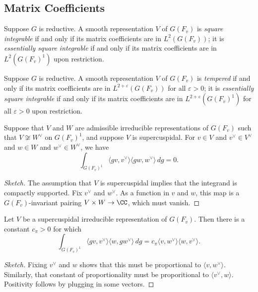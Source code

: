 \documentclass{article}
\begin{document}
\subsection{Matrix Coefficients}
\begin{definition}
	Suppose $G$ is reductive. A smooth representation $V$ of $G(F_v)$ is \textit{square integrable} if and only if its matrix coefficients are in $L^2(G(F_v))$; it is \textit{essentially square integrable} if and only if its matrix coefficients are in $L^2\left(G(F_v)^1\right)$ upon restriction.
\end{definition}
\begin{definition}[tempered]
	Suppose $G$ is reductive. A smooth representation $V$ of $G(F_v)$ is \textit{tempered} if and only if its matrix coefficients are in $L^{2+\varepsilon}(G(F_v))$ for all $\varepsilon>0$; it is \textit{essentially square integrable} if and only if its matrix coefficients are in $L^{2+\varepsilon}\left(G(F_v)^1\right)$ for all $\varepsilon>0$ upon restriction.
\end{definition}
\begin{lemma}[Orthogonality]
	Suppose that $V$ and $W$ are admissible irreducible representations of $G(F_v)$ such that $V\not\cong W^\lor$ on $G(F_v)^1$, and suppose $V$ is supercuspidal. For $v\in V$ and $v^\lor\in V^\lor$ and $w\in W$ and $w^\lor\in W^\lor$, we have
	\[\int_{G(F_v)^1}\langle gv,v^\lor\rangle\langle gw,w^\lor\rangle\,dg=0.\]
\end{lemma}
\begin{proof}[Sketch]
	The assumption that $V$ is supercuspidal implies that the integrand is compactly supported. Fix $v^\lor$ and $w^\lor$. As a function in $v$ and $w$, this map is a $G(F_v)$-invariant pairing $V\times W\to\CC$, which must vanish.
\end{proof}
\begin{lemma}[Orthogonality]
	Let $V$ be a supercuspidal irreducible representation of $G(F_v)$. Then there is a constant $c_\pi>0$ for which
	\[\int_{G(F_v)^1}\langle gv,v^\lor\rangle\langle w,gw^\lor\rangle\,dg=c_\pi\langle v,w^\lor\rangle\langle w,v^\lor\rangle.\]
\end{lemma}
\begin{proof}[Sketch]
	Fixing $v^\lor$ and $w$ shows that this must be proportional to $\langle v,w^\lor\rangle$. Similarly, that constant of proportionality must be proporitional to $\langle v^\lor,w\rangle$. Positivity follows by plugging in some vectors.
\end{proof}
\end{document}

